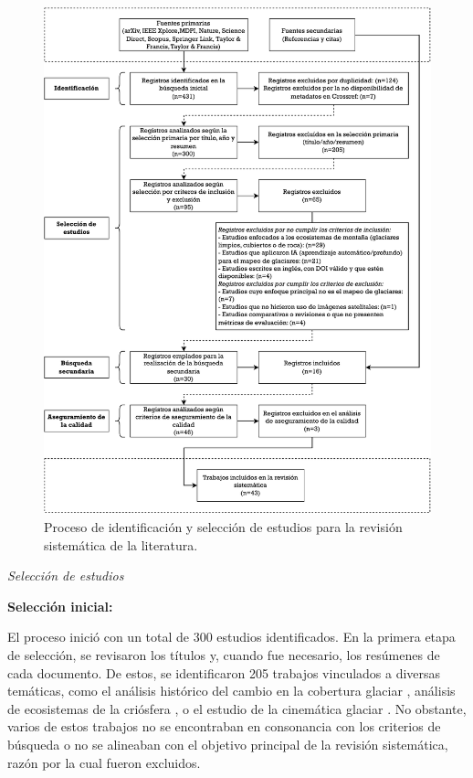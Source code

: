 \begin{figure}[H]
    \begin{center}
    \includegraphics[width=1\textwidth]{Images/ResumenRevision.pdf}
    \end{center}
    \caption{Proceso de identificación y selección de estudios para la revisión sistemática de la literatura.}
    \label{fig:ResumenRevision}
\end{figure}

\textit{Selección de estudios}

\textbf{Selección inicial:} 

El proceso inició con un total de 300 estudios identificados. En la primera etapa de selección, se revisaron los títulos y, cuando fue necesario, los resúmenes de cada documento. De estos, se identificaron 205 trabajos vinculados a diversas temáticas, como el análisis histórico del cambio en la cobertura glaciar \cite{kumar2020lake} \cite{intsiful2020glacier} \cite{wang2021current}, análisis de ecosistemas de la criósfera \cite{bourquin2022microbiome}, o el estudio de la cinemática glaciar \cite{dematteis2021ten} \cite{groh2019rock}. No obstante, varios de estos trabajos no se encontraban en consonancia con los criterios de búsqueda o no se alineaban con el objetivo principal de la revisión sistemática, razón por la cual fueron excluidos.

